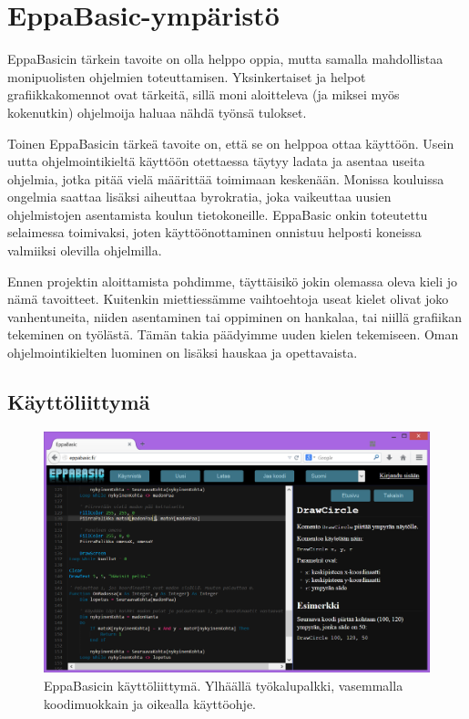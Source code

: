 \section{EppaBasic-ympäristö}
EppaBasicin tärkein tavoite on olla
helppo oppia,
mutta samalla mahdollistaa
monipuolisten ohjelmien toteuttamisen.
Yksinkertaiset ja helpot grafiikkakomennot ovat tärkeitä,
sillä moni aloitteleva (ja miksei myös kokenutkin)
ohjelmoija haluaa nähdä työnsä tulokset.

Toinen EppaBasicin tärkeä tavoite on,
että se on helppoa ottaa käyttöön.
Usein uutta ohjelmointikieltä käyttöön otettaessa
täytyy ladata ja asentaa useita ohjelmia,
jotka pitää vielä määrittää
toimimaan keskenään.
Monissa kouluissa
ongelmia saattaa lisäksi aiheuttaa byrokratia,
joka vaikeuttaa uusien ohjelmistojen asentamista
koulun tietokoneille.
EppaBasic onkin toteutettu
selaimessa toimivaksi, joten
käyttöönottaminen onnistuu
helposti koneissa valmiiksi
olevilla ohjelmilla.

Ennen projektin aloittamista pohdimme,
täyttäisikö jokin olemassa oleva
kieli jo nämä tavoitteet.
Kuitenkin miettiessämme vaihtoehtoja
useat kielet olivat joko vanhentuneita,
niiden asentaminen tai oppiminen on hankalaa,
tai niillä grafiikan tekeminen on työlästä.
Tämän takia päädyimme uuden kielen tekemiseen.
Oman ohjelmointikielten luominen on lisäksi hauskaa
ja opettavaista.

\subsection{Käyttöliittymä}
\begin{figure}[h]
    \centering
    \includegraphics[width=1\textwidth]{kayttoliittyma}
    \caption{EppaBasicin käyttöliittymä. Ylhäällä työkalupalkki, vasemmalla koodimuokkain ja oikealla käyttöohje.}
    \label{img:kayttoliittyma}
\end{figure}


